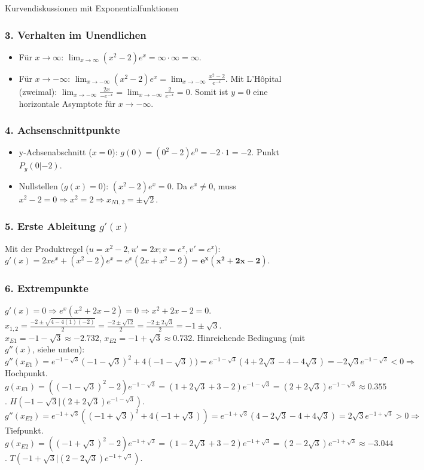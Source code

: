 \begin{loesungsumgebung}{Kurvendiskussionen mit Exponentialfunktionen}
\begin{enumerate}[label=(\alph*)]
    \subsubsection*{3. Verhalten im Unendlichen}
    \begin{itemize}
        \item Für $x \to \infty$: $\lim_{x \to \infty} (x^2-2)e^x = \infty \cdot \infty = \infty$.
        \item Für $x \to -\infty$: $\lim_{x \to -\infty} (x^2-2)e^x = \lim_{x \to -\infty} \frac{x^2-2}{e^{-x}}$. Mit L'Hôpital (zweimal):
        $\lim_{x \to -\infty} \frac{2x}{-e^{-x}} = \lim_{x \to -\infty} \frac{2}{e^{-x}} = 0$.
        Somit ist $y=0$ eine horizontale Asymptote für $x \to -\infty$.
    \end{itemize}

    \subsubsection*{4. Achsenschnittpunkte}
    \begin{itemize}
        \item y-Achsenabschnitt ($x=0$): $g(0) = (0^2-2)e^0 = -2 \cdot 1 = -2$. Punkt $P_y(0|-2)$.
        \item Nullstellen ($g(x)=0$): $(x^2-2)e^x = 0$. Da $e^x \neq 0$, muss $x^2-2=0 \Rightarrow x^2=2 \Rightarrow x_{N1,2} = \pm\sqrt{2}$.
    \end{itemize}

    \subsubsection*{5. Erste Ableitung $g'(x)$}
    Mit der Produktregel ($u=x^2-2, u'=2x; v=e^x, v'=e^x$):
    $g'(x) = 2xe^x + (x^2-2)e^x = e^x(2x+x^2-2) = \mathbf{e^x(x^2+2x-2)}$.

    \subsubsection*{6. Extrempunkte}
    $g'(x)=0 \Rightarrow e^x(x^2+2x-2)=0 \Rightarrow x^2+2x-2=0$.
    $x_{1,2} = \frac{-2 \pm \sqrt{4-4(1)(-2)}}{2} = \frac{-2 \pm \sqrt{12}}{2} = \frac{-2 \pm 2\sqrt{3}}{2} = -1 \pm \sqrt{3}$.
    $x_{E1} = -1-\sqrt{3} \approx -2.732$, $x_{E2} = -1+\sqrt{3} \approx 0.732$.
    Hinreichende Bedingung (mit $g''(x)$, siehe unten):
    $g''(x_{E1}) = e^{-1-\sqrt{3}}(-1-\sqrt{3})^2 + 4(-1-\sqrt{3})) = e^{-1-\sqrt{3}}(4+2\sqrt{3}-4-4\sqrt{3}) = -2\sqrt{3}e^{-1-\sqrt{3}} < 0 \Rightarrow$ Hochpunkt.
    $g(x_{E1}) = ((-1-\sqrt{3})^2-2)e^{-1-\sqrt{3}} = (1+2\sqrt{3}+3-2)e^{-1-\sqrt{3}} = (2+2\sqrt{3})e^{-1-\sqrt{3}} \approx 0.355$.
    $H(-1-\sqrt{3} | (2+2\sqrt{3})e^{-1-\sqrt{3}})$.
    $g''(x_{E2}) = e^{-1+\sqrt{3}}((-1+\sqrt{3})^2 + 4(-1+\sqrt{3})) = e^{-1+\sqrt{3}}(4-2\sqrt{3}-4+4\sqrt{3}) = 2\sqrt{3}e^{-1+\sqrt{3}} > 0 \Rightarrow$ Tiefpunkt.
    $g(x_{E2}) = ((-1+\sqrt{3})^2-2)e^{-1+\sqrt{3}} = (1-2\sqrt{3}+3-2)e^{-1+\sqrt{3}} = (2-2\sqrt{3})e^{-1+\sqrt{3}} \approx -3.044$.
    $T(-1+\sqrt{3} | (2-2\sqrt{3})e^{-1+\sqrt{3}})$.


\end{enumerate}
\end{loesungsumgebung}
